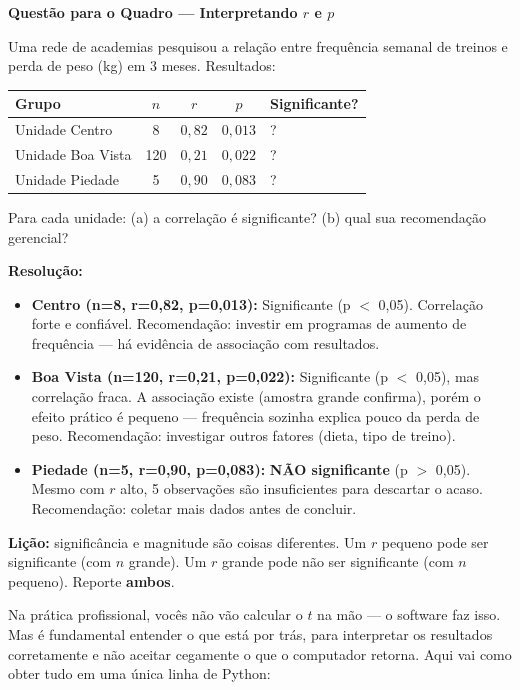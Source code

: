 \begin{SolvedBox}
\textbf{Questão para o Quadro — Interpretando $r$ e $p$}

Uma rede de academias pesquisou a relação entre frequência semanal
de treinos e perda de peso (kg) em 3 meses. Resultados:

\begin{center}
\begin{tabular}{|l|c|c|c|l|}
\hline
\textbf{Grupo} & \textbf{$n$} & \textbf{$r$} & \textbf{$p$} & \textbf{Significante?} \\
\hline
Unidade Centro & 8 & $0{,}82$ & $0{,}013$ & ? \\
Unidade Boa Vista & 120 & $0{,}21$ & $0{,}022$ & ? \\
Unidade Piedade & 5 & $0{,}90$ & $0{,}083$ & ? \\
\hline
\end{tabular}
\end{center}

Para cada unidade: (a) a correlação é significante? (b) qual sua
recomendação gerencial?

\textbf{Resolução:}
\begin{itemize}
  \item \textbf{Centro (n=8, r=0,82, p=0,013):} Significante (p $<$ 0,05).
  Correlação forte e confiável. Recomendação: investir em programas de
  aumento de frequência — há evidência de associação com resultados.
  \item \textbf{Boa Vista (n=120, r=0,21, p=0,022):} Significante
  (p $<$ 0,05), mas correlação fraca. A associação existe (amostra grande
  confirma), porém o efeito prático é pequeno — frequência sozinha explica
  pouco da perda de peso. Recomendação: investigar outros fatores (dieta,
  tipo de treino).
  \item \textbf{Piedade (n=5, r=0,90, p=0,083):} \textbf{NÃO significante}
  (p $>$ 0,05). Mesmo com $r$ alto, 5 observações são insuficientes para
  descartar o acaso. Recomendação: coletar mais dados antes de concluir.
\end{itemize}

\textbf{Lição:} significância e magnitude são coisas diferentes.
Um $r$ pequeno pode ser significante (com $n$ grande). Um $r$ grande
pode não ser significante (com $n$ pequeno). Reporte \textbf{ambos}.
\end{SolvedBox}

Na prática profissional, vocês não vão calcular o $t$ na mão — o
software faz isso.
Mas é fundamental entender o que está por trás, para interpretar os
resultados corretamente e não aceitar cegamente o que o computador
retorna.
Aqui vai como obter tudo em uma única linha de Python:

